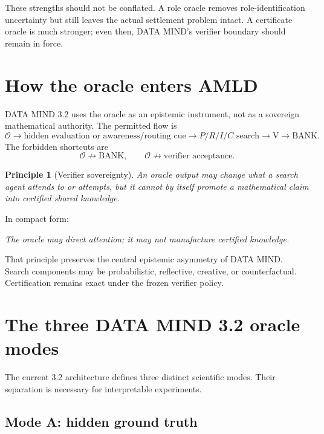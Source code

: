 \documentclass[11pt]{article}
\newtheorem{principle}[definition]{Principle}
\newcommand{\BANK}{\mathrm{BANK}}
\newcommand{\V}{\mathrm{V}}
\begin{document}
These strengths should not be conflated. A role oracle removes role-identification uncertainty but still leaves the actual settlement problem intact. A certificate oracle is much stronger; even then, DATA MIND's verifier boundary should remain in force.

\section{How the oracle enters AMLD}

DATA MIND 3.2 uses the oracle as an epistemic instrument, not as a sovereign mathematical authority. The permitted flow is
\begin{equation}
\boxed{
\mathscr O
\longrightarrow
\text{hidden evaluation or awareness/routing cue}
\longrightarrow
P/R/I/C\text{ search}
\longrightarrow
\V
\longrightarrow
\BANK.
}
\label{eq:flow}
\end{equation}
The forbidden shortcuts are
\begin{equation}
\mathscr O\not\longrightarrow\BANK,
\qquad
\mathscr O\not\longrightarrow\text{verifier acceptance}.
\label{eq:forbidden}
\end{equation}

\begin{principle}[Verifier sovereignty]
An oracle output may change what a search agent attends to or attempts, but it cannot by itself promote a mathematical claim into certified shared knowledge.
\end{principle}

In compact form:
\begin{center}
\emph{The oracle may direct attention; it may not manufacture certified knowledge.}
\end{center}

That principle preserves the central epistemic asymmetry of DATA MIND. Search components may be probabilistic, reflective, creative, or counterfactual. Certification remains exact under the frozen verifier policy.

\section{The three DATA MIND 3.2 oracle modes}

The current 3.2 architecture defines three distinct scientific modes. Their separation is necessary for interpretable experiments.

\subsection{Mode A: hidden ground truth}
\end{document}

